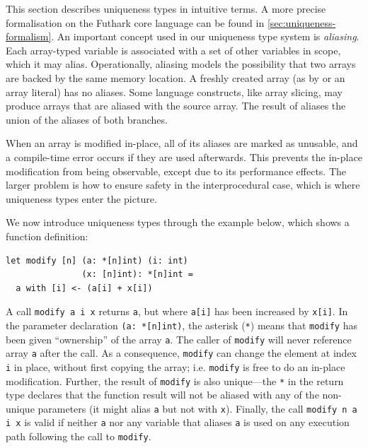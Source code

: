 This section describes uniqueness types in intuitive terms.  A more
precise formalisation on the Futhark core language can be found in
\cref{sec:uniqueness-formalism}.  An important concept used in our
uniqueness type system is \textit{aliasing}.  Each array-typed
variable is associated with a set of other variables in scope, which
it may alias.  Operationally, aliasing models the possibility that two
arrays are backed by the same memory location.  A freshly created
array (as by  or an array literal) has no aliases.  Some
language constructs, like array slicing, may produce arrays that are
aliased with the source array.  The result of  aliases the
union of the aliases of both branches.

When an array is modified in-place, all of its aliases are marked as
unusable, and a compile-time error occurs if they are used afterwards.
This prevents the in-place modification from being observable, except
due to its performance effects.  The larger problem is how to ensure
safety in the interprocedural case, which is where uniqueness types
enter the picture.

We now introduce uniqueness types through the example below, which
shows a function definition:

\begin{lstlisting}
let modify [n] (a: *[n]int) (i: int)
               (x: [n]int): *[n]int =
  a with [i] <- (a[i] + x[i])
\end{lstlisting}

A call \lstinline{modify a i x} returns \lstinline{a}, but where
\lstinline{a[i]} has been increased by \lstinline{x[i]}.  In the
parameter declaration \lstinline{(a: *[n]int)}, the asterisk
(\lstinline{*}) means that \lstinline{modify} has been given
``ownership'' of the array \lstinline{a}. The caller of
\lstinline{modify} will never reference array \lstinline{a} after the
call.  As a consequence, \lstinline{modify} can change the element at
index \lstinline{i} in place, without first copying the array;
i.e. \lstinline{modify} is free to do an in-place modification.
Further, the result of \lstinline{modify} is also unique---the
\lstinline{*} in the return type declares that the function result
will not be aliased with any of the non-unique parameters (it might
alias \lstinline{a} but not with \lstinline{x}). Finally, the call
\lstinline!modify n a i x! is valid if neither \lstinline{a} nor any
variable that aliases \lstinline{a} is used on any execution path
following the call to \lstinline{modify}.

